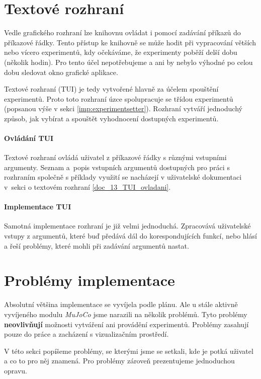 \section{Textové rozhraní} \label{imp:TUI}
Vedle grafického rozhraní lze knihovnu ovládat i pomocí zadávání příkazů do
příkazové řádky. Tento přístup ke knihovně se může hodit při vypracování
větších nebo vícero experimentů, kdy očekáváme, že experimenty poběží delší
dobu (několik hodin). Pro tento účel nepotřebujeme a ani by nebylo
výhodné po celou dobu sledovat okno grafické aplikace.

Textové rozhraní (TUI) je tedy vytvořené hlavně za účelem spouštění
experimentů. Proto toto rozhraní úzce spolupracuje se třídou experimentů
(popsanou výše v sekci \ref{imp:experimentsetter}). Rozhraní vytváří jednoduchý
způsob, jak vybírat a spouštět vyhodnocení dostupných experimentů.

\paragraph{Ovládání TUI}
Textové rozhraní ovládá uživatel z příkazové řádky s různými vstupními
argumenty. Seznam a~popis vstupních argumentů dostupných pro práci s rozhraním
společně s příklady využití se nacházejí v uživatelské dokumentaci v~sekci o
textovém rozhraní \ref{doc_13_TUI_ovladani}.

\paragraph{Implementace TUI}
Samotná implementace rozhraní je již velmi jednoduchá. Zpracovává uživatelské
vstupy z argumentů, které buď předává dál do korespondujících funkcí, nebo
hlásí a řeší problémy, které mohli při zadávání argumentů nastat.

\section{Problémy implementace} \label{imp:problems}
Absolutní většina implementace se vyvíjela podle plánu. Ale u stále aktivně
vyvíjeného modulu \emph{MuJoCo} jsme narazili na několik problémů. Tyto
problémy \textbf{neovlivňují} možnosti vytváření ani provádění experimentů.
Problémy zasahují pouze do práce a zacházení s vizualizačním prostředí.

V této sekci popíšeme problémy, se kterými jsme se setkali, kde je potká
uživatel a co to pro něj znamená. Pro problémy zároveň prezentujeme jednoduchou
opravu.

